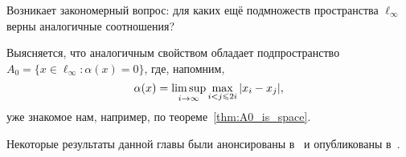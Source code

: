 Возникает закономерный вопрос: для каких ещё подмножеств пространства $\ell_\infty$
верны аналогичные соотношения?

Выясняется, что аналогичным свойством обладает подпространство
$A_0 = \{ x \in \ell_\infty : \alpha(x) =0 \}$,
где, напомним,
\begin{equation*}
	\alpha(x) = \varlimsup_{i\to\infty} \max_{i<j\leqslant 2i} |x_i - x_j|
	,
\end{equation*}
уже знакомое нам, например, по теореме~\ref{thm:A0_is_space}.

Некоторые результаты данной главы были анонсированы в~\cite{our-mz2021linearhulls}
и опубликованы в~\cite{avdeev2021vestnik}.
